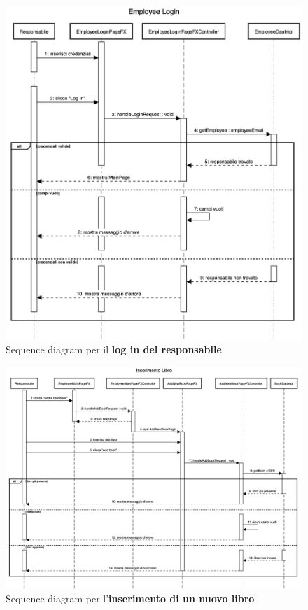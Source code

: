 \documentclass[12pt,a4paper]{article}
\begin{document}
	\begin{figure}[h!]
		\centering
		\includegraphics[scale=0.5]{images/SequenceDiagrams/EmployeeLogin.png}
		\caption{Sequence diagram per il \textbf{log in del responsabile}}
	\end{figure}
	\newpage
	\begin{figure}[h!]
		\centering
		\includegraphics[scale=0.35]{images/SequenceDiagrams/InserimentoLibro.png}
		\caption{Sequence diagram per l'\textbf{inserimento di un nuovo libro}}
	\end{figure}
\end{document}
